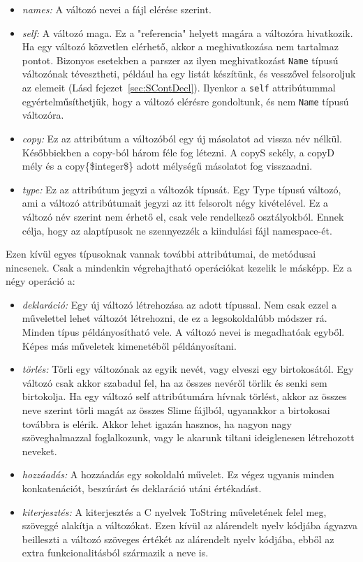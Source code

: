 \begin{itemize}
\item \emph{names:} 
A változó nevei a fájl elérése szerint.
\item \emph{self:} 
A változó maga. 
Ez a "referencia" helyett magára a változóra hivatkozik.
Ha egy változó közvetlen elérhető, akkor a meghivatkozása nem tartalmaz pontot.
Bizonyos esetekben a parszer az ilyen meghivatkozást \texttt{Name} típusú változónak tévesztheti, például ha egy listát készítünk, és vesszővel felsoroljuk az elemeit (Lásd fejezet~\ref{sec:SContDecl}).
Ilyenkor a \texttt{self} attribútummal egyértelműsíthetjük, hogy a változó elérésre gondoltunk, és nem \texttt{Name} típusú változóra. 
\item \emph{copy:}
Ez az attribútum a változóból egy új másolatot ad vissza név nélkül.
Későbbiekben a copy-ból három féle fog létezni. 
A copyS sekély, a copyD mély és a copy\{\$integer\$\} adott mélységű másolatot fog visszaadni.
\item \emph{type:}
Ez az attribútum jegyzi a változók típusát.
Egy Type típusú változó, ami a változó attribútumait jegyzi az itt felsorolt négy kivételével.
Ez a változó név szerint nem érhető el, csak vele rendelkező osztályokból.
Ennek célja, hogy az alaptípusok ne szennyezzék a kiindulási fájl namespace-ét.
\end{itemize}

Ezen kívül egyes típusoknak vannak további attribútumai, de metódusai nincsenek. 
Csak a mindenkin végrehajtható operációkat kezelik le másképp. 
Ez a négy operáció a:
\begin{itemize}
\item \emph{deklaráció:} 
Egy új változó létrehozása az adott típussal.
Nem csak ezzel a művelettel lehet változót létrehozni, de ez a legsokoldalúbb módszer rá.
Minden típus példányosítható vele.
A változó nevei is megadhatóak egyből.
Képes más műveletek kimenetéből példányosítani.
\item \emph{törlés:} 
Törli egy változónak az egyik nevét, vagy elveszi egy birtokosától.
Egy változó csak akkor szabadul fel, ha az összes nevéről törlik és senki sem birtokolja.
Ha egy változó self attribútumára hívnak törlést, akkor az összes neve szerint törli magát az összes Slime fájlból, ugyanakkor a birtokosai továbbra is elérik.
Akkor lehet igazán hasznos, ha nagyon nagy szöveghalmazzal foglalkozunk, vagy le akarunk tiltani ideiglenesen létrehozott neveket.
\item \emph{hozzáadás:}
A hozzáadás egy sokoldalú művelet. 
Ez végez ugyanis minden konkatenációt, beszúrást és deklaráció utáni értékadást.
\item \emph{kiterjesztés:}
A kiterjesztés a C nyelvek ToString műveletének felel meg, szöveggé alakítja a változókat.
Ezen kívül az alárendelt nyelv kódjába ágyazva beilleszti a változó szöveges értékét az alárendelt nyelv kódjába, ebből az extra funkcionalitásból származik a neve is.
\end{itemize}

